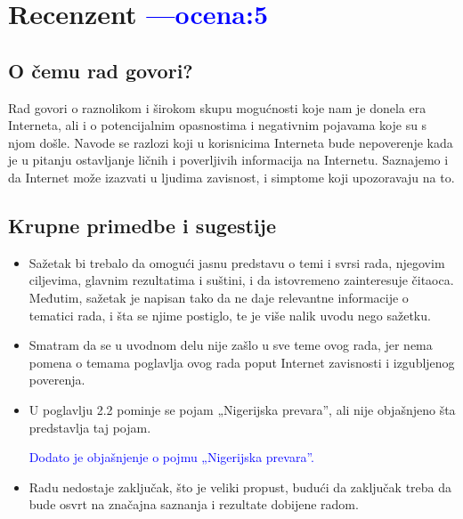 \documentclass[a4paper]{report}
\newcommand{\odgovor}[1]{\textcolor{blue}{#1}}
\begin{document}
\chapter{Recenzent \odgovor{---ocena:5}}


\section{O čemu rad govori?}
Rad govori o raznolikom i širokom skupu mogućnosti koje nam je donela era Interneta, ali i o potencijalnim opasnostima i negativnim pojavama koje su s njom došle. Navode se razlozi koji u korisnicima Interneta bude nepoverenje kada je u pitanju ostavljanje ličnih i poverljivih informacija na Internetu. Saznajemo i da Internet može izazvati u ljudima zavisnost, i simptome koji upozoravaju na to.

\section{Krupne primedbe i sugestije}
\begin{itemize}
    \item Sažetak bi trebalo da omogući jasnu predstavu o temi i svrsi rada, njegovim ciljevima, glavnim rezultatima i suštini, i da istovremeno zainteresuje čitaoca. Međutim, sažetak je napisan tako da ne daje relevantne informacije o tematici rada, i šta se njime postiglo, te je više nalik uvodu nego sažetku. 
    
    \odgovor{}
\end{itemize}
\begin{itemize}
    \item Smatram da se u uvodnom delu nije zašlo u sve teme ovog rada, jer nema pomena o temama poglavlja ovog rada poput Internet zavisnosti i izgubljenog poverenja. 
    
    \odgovor{}
\end{itemize}
\begin{itemize}
    \item U poglavlju 2.2 pominje se pojam „Nigerijska prevara”, ali nije objašnjeno šta predstavlja taj pojam.
   
    \odgovor{Dodato je objašnjenje o pojmu „Nigerijska prevara”.}
\end{itemize}
\begin{itemize}
    \item  Radu nedostaje zaključak, što je veliki propust, budući da zaključak treba da bude osvrt na značajna saznanja i rezultate dobijene radom. 
   
    \odgovor{}
\end{itemize}
\end{document}

